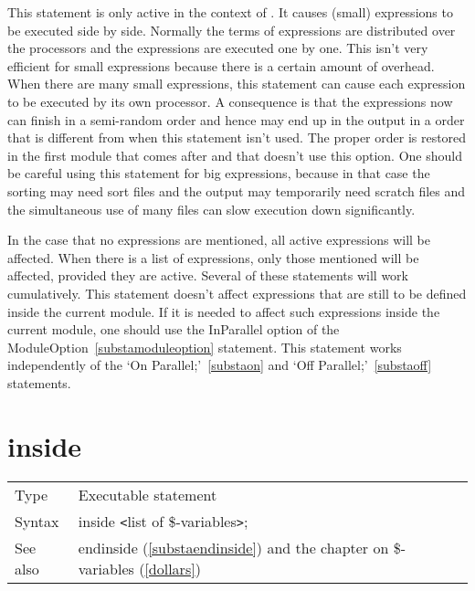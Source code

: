 \noindent This statement is only active in the context of 
\TFORM{}. It causes 
(small) expressions to be executed side by side. Normally the terms of 
expressions are distributed over the processors and the expressions are 
executed one by one. This isn't very efficient for small expressions 
because there is a certain amount of overhead. When there are many small 
expressions, this statement can cause each expression to be executed by its 
own processor. A consequence is that the expressions now can finish in a 
semi-random order and hence may end up in the output in a order that is 
different from when this statement isn't used. The proper order is restored 
in the first module that comes after and that doesn't use this option. One 
should be careful using this statement for big expressions, because in that 
case the sorting may need sort files and the output may temporarily need 
scratch files and the simultaneous use of many files can slow execution 
down significantly.

\noindent In the case that no expressions are mentioned, all active 
expressions will be affected. When there is a list of expressions, only 
those mentioned will be affected, provided they are active. Several of 
these statements will work cumulatively. This statement doesn't affect 
expressions that are still to be defined inside the current module. If it 
is needed to affect such expressions inside the current module, one should 
use the InParallel option of the 
ModuleOption~\ref{substamoduleoption} 
statement. This statement works independently of the `On 
Parallel;'~\ref{substaon} and `Off Parallel;'~\ref{substaoff} statements.
\vspace{10mm}


\section{inside}
\label{substainside}

\noindent \begin{tabular}{ll}
Type & Executable statement\\
Syntax & inside {\tt<}list of \$-variables{\tt>};
\\ See also & endinside (\ref{substaendinside}) and the chapter on \$-variables 
(\ref{dollars})
\end{tabular} \vspace{4mm}

